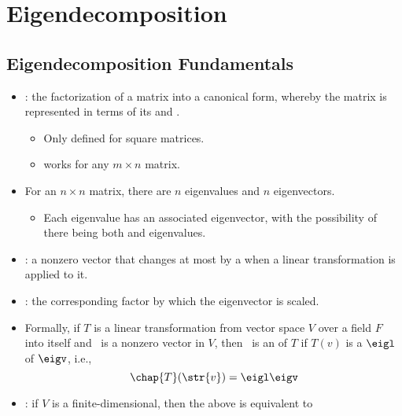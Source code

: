 \chapter{Eigendecomposition}\label{Eigendecomposition}

\section{Eigendecomposition Fundamentals}\label{Eigendecomposition Fundamentals}
\begin{itemize}
  \item {}: the factorization of a matrix into a canonical form, whereby the matrix is represented in terms of its  and .
    \begin{itemize}
      \item Only defined for square matrices. 
      \item \hyperref[Singular Value Decomposition]{} works for any \(m\times n\) matrix.
    \end{itemize}
  \item For an \(n \times n\) matrix, there are \(n\) eigenvalues and \(n\) eigenvectors.
    \begin{itemize}
      \item Each eigenvalue has an associated eigenvector, with the possibility of there being both \hyperref[Eigenvectors of Distinct Eigenvalues]{} and \hyperref[Eigenvectors of Repeated Eigenvalues]{} eigenvalues.
    \end{itemize}
  \item \textbf{}: a nonzero vector that changes at most by a \hyperref[Vector Scalar Multiplication]{} when a linear transformation is applied to it. 
  \item \textbf{}: the corresponding factor by which the eigenvector is scaled.
  \item Formally, if \(T\) is a linear transformation from vector space \(V\) over a field \(F\) into itself and \eigv~is a nonzero vector in \(V\), then \eigv~is an  of \(T\) if \(T(v)\) is a  \(\eigl \) of \(\eigv \), i.e.,
  \[%
  \chap{T}(\str{v}) = \eigl \eigv
  \]%
  \item {}: if \(V\) is a finite-dimensional, then the above is equivalent to

\end{itemize}
